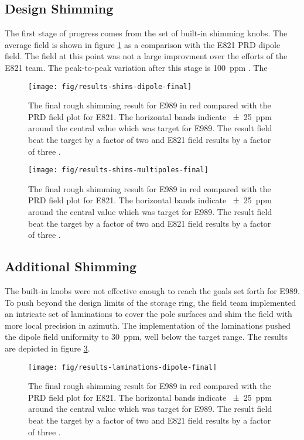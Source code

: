 \subsection{Design Shimming}

The first stage of progress comes from the set of built-in shimming knobs.  The average field is shown in figure \ref{fig:results-shims-dipole-final} as a comparison with the E821 PRD dipole field.  The field at this point was not a large improvment over the efforts of the E821 team.  The peak-to-peak variation after this stage is \SI{100}{ppm} .  The 

\begin{figure}
\label{fig:results-shims-dipole-final}
\texttt{[image: fig/results-shims-dipole-final]}
\caption{The final rough shimming result for E989 in red compared with the PRD field plot for E821.  The horizontal bands indicate \SI{\pm 25}{ppm} around the central value which was target for E989.  The result field beat the target by a factor of two and E821 field results by a factor of three .}
\end{figure}

\begin{figure}
\label{fig:results-shims-multipoles-final}
\texttt{[image: fig/results-shims-multipoles-final]}
\caption{The final rough shimming result for E989 in red compared with the PRD field plot for E821.  The horizontal bands indicate \SI{\pm 25}{ppm} around the central value which was target for E989.  The result field beat the target by a factor of two and E821 field results by a factor of three .}
\end{figure}

\subsection{Additional Shimming}

The built-in knobs were not effective enough to reach the goals set forth for E989.  To push beyond the design limits of the \gmtwo storage ring, the field team implemented an intricate set of laminations to cover the pole surfaces and shim the field with more local precision in azimuth.  The implementation of the laminations pushed the dipole field uniformity to \SI{30}{ppm}, well below the target range.  The results are depicted in figure \ref{fig:results-laminations-dipole-final}.

\begin{figure}
\label{fig:results-laminations-dipole-final}
\texttt{[image: fig/results-laminations-dipole-final]}
\caption{The final rough shimming result for E989 in red compared with the PRD field plot for E821.  The horizontal bands indicate \SI{\pm 25}{ppm} around the central value which was target for E989.  The result field beat the target by a factor of two and E821 field results by a factor of three .}
\end{figure}

